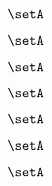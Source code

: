 {\begin{forslides}




        \begin{equation}
            \label{eq:slides-translation-30}
            \setA
        \end{equation}

        \begin{equation}
            \label{eq:slides-translation-31}
            \setA
        \end{equation}

        \begin{equation}
            \label{eq:slides-translation-32}
            \setA
        \end{equation}

        \begin{equation}
            \label{eq:slides-translation-33}
            \setA
        \end{equation}

        \begin{equation}
            \label{eq:slides-translation-34}
            \setA
        \end{equation}

        \begin{equation}
            \label{eq:slides-translation-35}
            \setA
        \end{equation}

        \begin{equation}
            \label{eq:slides-translation-36}
            \setA
        \end{equation}


\end{forslides}}
